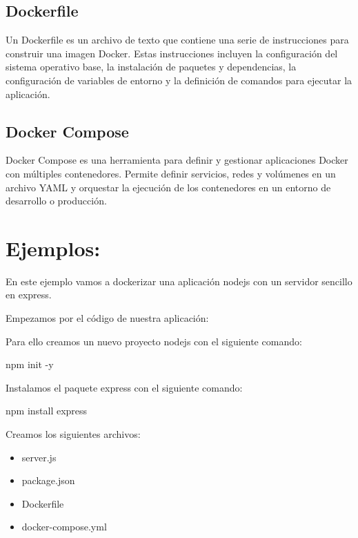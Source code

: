 \documentclass[
  a4paper,
  DIV=11,
  numbers=noendperiod,
  onepage,
  openany]{scrreprt}
\newenvironment{Shaded}{\begin{snugshade}}{\end{snugshade}}
\newcommand{\AttributeTok}[1]{\textcolor[rgb]{0.40,0.45,0.13}{#1}}
\newcommand{\ExtensionTok}[1]{\textcolor[rgb]{0.00,0.23,0.31}{#1}}
\newcommand{\NormalTok}[1]{\textcolor[rgb]{0.00,0.23,0.31}{#1}}
\providecommand{\tightlist}{%
  \setlength{\itemsep}{0pt}\setlength{\parskip}{0pt}}\usepackage{longtable,booktabs,array}
\begin{document}
\subsection{Dockerfile}\label{dockerfile}

Un Dockerfile es un archivo de texto que contiene una serie de
instrucciones para construir una imagen Docker. Estas instrucciones
incluyen la configuración del sistema operativo base, la instalación de
paquetes y dependencias, la configuración de variables de entorno y la
definición de comandos para ejecutar la aplicación.

\subsection{Docker Compose}\label{docker-compose}

Docker Compose es una herramienta para definir y gestionar aplicaciones
Docker con múltiples contenedores. Permite definir servicios, redes y
volúmenes en un archivo YAML y orquestar la ejecución de los
contenedores en un entorno de desarrollo o producción.

\section{Ejemplos:}\label{ejemplos-1}

En este ejemplo vamos a dockerizar una aplicación nodejs con un servidor
sencillo en express.

Empezamos por el código de nuestra aplicación:

Para ello creamos un nuevo proyecto nodejs con el siguiente comando:

\begin{Shaded}
\begin{Highlighting}[]
\ExtensionTok{npm}\NormalTok{ init }\AttributeTok{{-}y}
\end{Highlighting}
\end{Shaded}

Instalamos el paquete express con el siguiente comando:

\begin{Shaded}
\begin{Highlighting}[]
\ExtensionTok{npm}\NormalTok{ install express}
\end{Highlighting}
\end{Shaded}

Creamos los siguientes archivos:

\begin{itemize}
\tightlist
\item
  server.js
\item
  package.json
\item
  Dockerfile
\item
  docker-compose.yml
\end{itemize}
\end{document}
